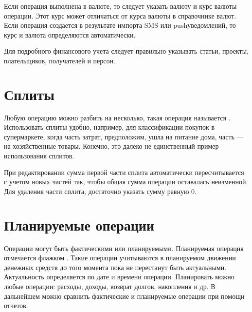 \documentclass[a4paper,10pt,russian]{sphinxmanual}
\begin{document}
\sphinxAtStartPar
Если операция выполнена в валюте, то следует указать валюту и курс валюты операции. Этот курс может отличаться
от курса валюты в справочнике валют. Если операция создается в результате импорта SMS или push\sphinxhyphen{}уведомлений, то
курс и валюта определяются автоматически.

\sphinxAtStartPar
Для подробного финансового учета следует правильно указывать статьи, проекты, плательщиков, получателей и персон.


\section{Сплиты}
\label{\detokenize{transactions:id3}}
\sphinxAtStartPar
Любую операцию можно разбить на несколько, такая операция называется {\hyperref[\detokenize{glossary:term-0}]{}}. Использовать сплиты удобно, например,
для классификации покупок в супермаркете, когда часть затрат, предположим, ушла на питание дома, часть — на
хозяйственные товары. Конечно, это далеко не единственный пример использования сплитов.

\sphinxAtStartPar
При редактировании сумма первой части сплита автоматически пересчитывается с учетом новых частей так, чтобы
общая сумма операции оставалась неизменной. Для удаления части сплита, достаточно указать сумму равную 0.

\noindent{}
\noindent{}
\noindent{}
\noindent{}
\noindent{}


\section{Планируемые операции}
\label{\detokenize{transactions:id4}}
\sphinxAtStartPar
Операции могут быть фактическими или планируемыми. Планируемая операция отмечается флажком . Такие операции
учитываются в планируемом движении денежных средств до того момента пока не перестанут быть актуальными.
Актуальность определяется по дате и времени операции. Планировать можно любые операции: расходы, доходы,
возврат долгов, накопления и др. В дальнейшем можно сравнить фактические и планируемые операции при помощи отчетов.
\end{document}
